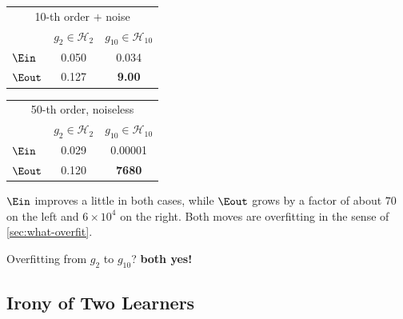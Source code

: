 \begin{center}
    \begin{tabular}{l|cc}
        \multicolumn{3}{c}{10-th order \(+\) noise}\\[2pt]
        & \(g_2 \in \mathcal{H}_2\) & \(g_{10} \in \mathcal{H}_{10}\)\\
        \hline
        \(\Ein\) & 0.050 & 0.034\\
        \(\Eout\) & 0.127 & \textbf{9.00}
    \end{tabular}
    \hspace{1.2cm}
    \begin{tabular}{l|cc}
        \multicolumn{3}{c}{50-th order, noiseless}\\[2pt]
        & \(g_2 \in \mathcal{H}_2\) & \(g_{10} \in \mathcal{H}_{10}\)\\
        \hline
        \(\Ein\) & 0.029 & 0.00001\\
        \(\Eout\) & 0.120 & \textbf{7680}
    \end{tabular}
\end{center}

\(\Ein\) improves a little in both cases, while \(\Eout\) grows by a factor of
about \(70\) on the left and \(6 \times 10^4\) on the right. Both moves are
overfitting in the sense of \autoref{sec:what-overfit}.

\begin{moral}
    Overfitting from \(g_2\) to \(g_{10}\)? \textbf{both yes!}
\end{moral}

\subsection{Irony of Two Learners}

\begin{center}
\end{center}

